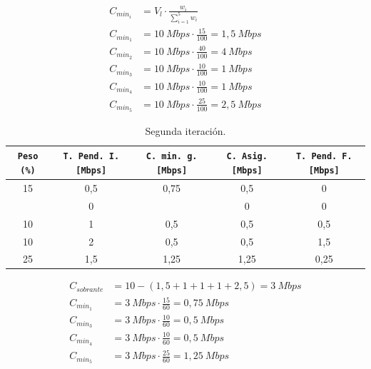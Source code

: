 \documentclass[11pt]{article}
\begin{document}
        \begin{align} \label{eq:iter1}
            C_{min_i} &= V_l \cdot \frac{w_i}{\sum_{i = 1}^5 w_i}\\
            C_{min_1} &= 10\ Mbps \cdot \frac{15}{100} = 1,5\ Mbps\\
            C_{min_2} &= 10\ Mbps \cdot \frac{40}{100} = 4\ Mbps\\
            C_{min_3} &= 10\ Mbps \cdot \frac{10}{100} = 1\ Mbps\\
            C_{min_4} &= 10\ Mbps \cdot \frac{10}{100} = 1\ Mbps\\
            C_{min_5} &= 10\ Mbps \cdot \frac{25}{100} = 2,5\ Mbps
        \end{align}

        \begin{table}
            \centering
            \begin{tabular}{|c|c|c|c|c|}
                \hline
                \texttt{Peso (\%)} & \texttt{T. Pend. I. [Mbps]} & \texttt{C. min. g. [Mbps]} & \texttt{C. Asig. [Mbps]} & \texttt{T. Pend. F. [Mbps]}\\
                \hline
                15 & 0,5 & 0,75 & 0,5 & 0\\
                \hline
                & 0 & & 0 & 0\\
                \hline
                10 & 1 & 0,5 & 0,5 & 0,5\\
                \hline
                10 & 2 & 0,5 & 0,5 & 1,5\\
                \hline
                25 & 1,5 & 1,25 & 1,25 & 0,25\\
                \hline
            \end{tabular}
            \caption{Segunda iteración.}
            \label{tab:iter2}
        \end{table}

        \begin{align} \label{eq:iter2}
            C_{sobrante} &=  10 - (1,5 + 1 + 1 + 1 + 2,5) = 3\ Mbps\\
            C_{min_1} &= 3\ Mbps \cdot \frac{15}{60} = 0,75\ Mbps\\
            C_{min_3} &= 3\ Mbps \cdot \frac{10}{60} = 0,5\ Mbps\\
            C_{min_4} &= 3\ Mbps \cdot \frac{10}{60} = 0,5\ Mbps\\
            C_{min_5} &= 3\ Mbps \cdot \frac{25}{60} = 1,25\ Mbps
        \end{align}
\end{document}

